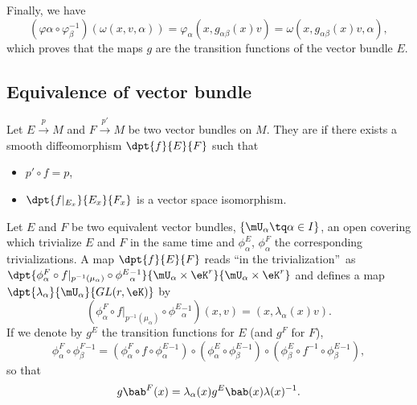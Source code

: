 Finally, we have 
\begin{equation}
  (\varphi\alpha\circ\varphi_{\beta}^{-1})(\omega(x,v,\alpha))=\varphi_{\alpha}(x,g_{\alpha\beta}(x)v)
                                                   =\omega(x,g_{\alpha\beta}(x)v,\alpha),
\end{equation}
which proves that the maps $g$ are the transition functions of the vector bundle $E$.

\subsection{Equivalence of vector bundle}

Let $E\stackrel{p}{\longrightarrow}M$ and $F\stackrel{p'}{\longrightarrow}M$ be two vector bundles on $M$. They are  if there exists a smooth diffeomorphism $\dpt{f}{E}{F}$ such that 

\begin{itemize}
\item $p'\circ f=p$,
\item $\dpt{f|_{E_x}}{E_x}{F_x}$ is a vector space isomorphism.
\end{itemize}

Let $E$ and $F$ be two equivalent vector bundles, $\{\mU_{\alpha}\tq \alpha\in I\}$, an open covering which trivialize $E$ and $F$ in the same time and $\phi^E_{\alpha}$, $\phi^F_{\alpha}$ the corresponding trivializations. A map $\dpt{f}{E}{F}$ reads ``in the trivialization''\ as $\dpt{\phi^F_{\alpha}\circ f|_{p^{-1}(\mu_{\alpha})}\circ\phi^E{}^{-1}_{\alpha}}{\mU_{\alpha}\times\eK^r}{\mU_{\alpha}\times\eK^r}$ and defines a map $\dpt{\lambda_{\alpha}}{\mU_{\alpha}}{GL(r,\eK)}$ by
\begin{equation}
(\phi^F_{\alpha}\circ f|_{p^{-1}(\mu_{\alpha})}\circ\phi^E{}^{-1}_{\alpha})(x,v)=(x,\lambda_{\alpha}(x)v).
\end{equation}
If we denote by $g^E$ the transition functions for $E$ (and $g^F$ for $F$),
\[
 \phi^F_{\alpha}\circ\phi^F_{\beta}{}^{-1}= (\phi^F_{\alpha}\circ f\circ\phi_{\alpha}^E{}^{-1})\circ
                                        (\phi^E_{\alpha}\circ\phi^E_{\beta}{}^{-1})\circ
					(\phi^E_{\beta}\circ f^{-1}\circ\phi_{\beta}^E{}^{-1}),
\]
so that 
\begin{equation}\label{eq:g_l_g_l}
  g\bab^F(x)=\lambda_{\alpha}(x) g^E\bab(x)\lambda(x)^{-1}.
\end{equation}

